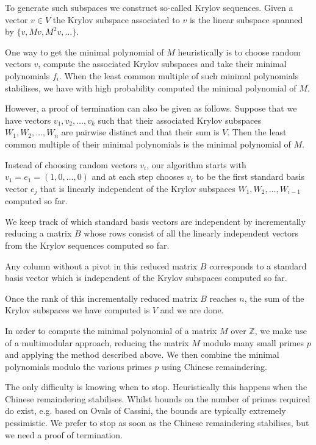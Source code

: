 \documentclass{sig-alternate-05-2015}
\begin{document}
To generate such subspaces we construct so-called Krylov sequences. Given
a vector $v \in V$ the Krylov subspace associated to $v$ is the linear
subspace spanned by $\{v, Mv, M^2v, \ldots\}$.

One way to get the minimal polynomial of $M$ heuristically is to choose
random vectors $v$, compute the associated Krylov subspaces and take their
minimal polynomials $f_i$. When the least common multiple of such minimal
polynomials stabilises, we have with high probability computed the minimal
polynomial of $M$.

However, a proof of termination can also be given as follows. Suppose that
we have vectors $v_1, v_2, \ldots, v_k$ such that their associated Krylov
subspaces $W_1, W_2, \ldots, W_n$ are pairwise distinct and that their
sum is $V$. Then the least common multiple of their minimal polynomials is
the minimal polynomial of $M$.

Instead of choosing random vectors $v_i$, our algorithm starts with
$v_1 = e_1 = (1, 0, \ldots, 0)$ and at each step chooses $v_i$ to be
the first standard basis vector $e_j$ that is linearly independent of the
Krylov subspaces $W_1, W_2, \ldots, W_{i-1}$ computed so far.

We keep track of which standard basis vectors are independent by
incrementally reducing a matrix $B$ whose rows consist of all the
linearly independent vectors from the Krylov sequences computed so
far.

Any column without a pivot in this reduced matrix $B$ corresponds to a
standard basis vector which is independent of the Krylov subspaces
computed so far.

Once the rank of this incrementally reduced matrix $B$ reaches $n$, the sum
of the Krylov subspaces we have computed is $V$ and we are done.

In order to compute the minimal polynomial of a matrix $M$ over $\mathbb{Z}$,
we make use of a multimodular approach, reducing the matrix $M$ modulo many
small primes $p$ and applying the method described above. We then combine
the minimal polynomials modulo the various primes $p$ using Chinese
remaindering.

The only difficulty is knowing when to stop. Heuristically this happens
when the Chinese remaindering stabilises. Whilst bounds on the number of
primes required do exist, e.g. based on Ovals of Cassini, the bounds are
typically extremely pessimistic. We prefer to stop as soon as the Chinese
remaindering stabilises, but we need a proof of termination. 
\end{document}
